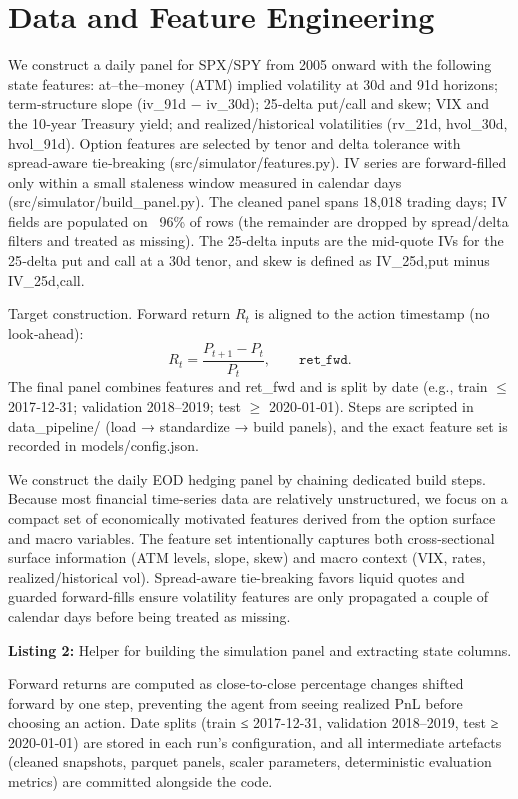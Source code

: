 \documentclass[,11pt,letterpaper,twocolumn]{article}
\begin{document}
\section{Data and Feature
Engineering}\label{data-and-feature-engineering}

We construct a daily panel for SPX/SPY from 2005 onward with the
following state features: at--the--money (ATM) implied volatility at 30d and 91d
horizons; term‑structure slope (iv\_91d − iv\_30d); 25‑delta put/call
and skew; VIX and the 10‑year Treasury yield; and realized/historical
volatilities (rv\_21d, hvol\_30d, hvol\_91d). Option features are
selected by tenor and delta tolerance with spread‑aware tie‑breaking
(src/simulator/features.py). IV series are forward‑filled only within a
small staleness window measured in calendar days
(src/simulator/build\_panel.py).
The cleaned panel spans 18{,}018 trading days; IV fields are populated
on ~96\% of rows (the remainder are dropped by spread/delta filters and
treated as missing). The 25‑delta inputs are the mid-quote IVs for the
25‑delta put and call at a 30d tenor, and skew is defined as
IV\_{25d,put} minus IV\_{25d,call}.

Target construction. Forward return $R_t$ is aligned to the action
timestamp (no look‑ahead):
\[
  R_t = \frac{P_{t+1} - P_t}{P_t}, \qquad \texttt{ret\_fwd}.
\]
The final panel combines features and ret\_fwd and is split by date
(e.g., train $\leq$ 2017‑12‑31; validation 2018--2019; test $\geq$
2020‑01‑01). Steps are scripted in data\_pipeline/ (load → standardize → build panels), and the exact feature set is recorded in
models/config.json.

We construct the daily EOD hedging panel by chaining dedicated build steps.
Because most financial time-series data are relatively unstructured, we focus 
on a compact set of economically motivated features derived from the option 
surface and macro variables. The feature set intentionally captures both cross-sectional surface information (ATM
levels, slope, skew) and macro context (VIX, rates, realized/historical
vol). Spread-aware tie-breaking favors liquid quotes and 
guarded forward-fills ensure volatility features are only propagated a
couple of calendar days before being treated as missing.

\noindent\textbf{Listing 2:} Helper for building the simulation panel and extracting state columns.


Forward returns are computed as close-to-close percentage changes
shifted forward by one step, preventing the agent from seeing realized
PnL before choosing an action. Date splits (train ≤ 2017-12-31,
validation 2018--2019, test ≥ 2020-01-01) are stored in each run's
configuration, and all intermediate artefacts (cleaned snapshots, parquet
panels, scaler parameters, deterministic evaluation metrics) are
committed alongside the code.
\end{document}

